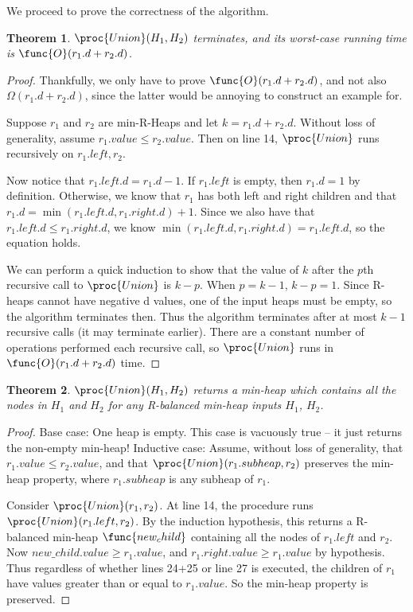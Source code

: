 \documentclass[11pt, answers]{exam}
\theoremstyle{plain}
\newtheorem{theorem}{Theorem}
\theoremstyle{definition}
\begin{document}
\begin{questions}
\begin{parts}
\begin{solution}
We proceed to prove the correctness of the algorithm. \\

\begin{theorem}
$\proc{Union}(H_1, H_2)$ terminates, and its worst-case running time is $\func{O}(r_1 .d + r_2 .d)$.
\end{theorem}

\begin{proof}
Thankfully, we only have to prove $\func{O}(r_1 .d + r_2 .d)$, and not also $\Omega(r_1 .d + r_2 .d)$, since the latter would be annoying to construct an example for. 

Suppose $r_1$ and $r_2$ are min-R-Heaps and let $k = r_1 .d + r_2 .d$. Without loss of generality, assume $r_1.value \leq r_2.value$. Then on line 14, $\proc{Union}$ runs recursively on $r_1.left, r_2$. 

Now notice that $r_1.left.d = r_1.d - 1$. If $r_1.left$ is empty, then $r_1.d = 1$ by definition. Otherwise, we know that $r_1$ has both left and right children and that $r_1.d = \min(r_1.left.d, r_1.right.d) + 1$. Since we also have that $r_1.left.d  \leq r_1.right.d$, we know
$\min(r_1.left.d, r_1.right.d) = r_1.left.d$, so the equation holds.

We can perform a quick induction to show that the value of $k$ after the $p$th recursive call to $\proc{Union}$ is $k-p$. When $p = k-1$, $k-p = 1$. Since R-heaps cannot have negative d values, one of the input heaps must be empty, so the algorithm terminates then. Thus the algorithm terminates after at most $k-1$ recursive calls (it may terminate earlier). There are a constant number of operations performed each recursive call, so $\proc{Union}$ runs in $\func{O}(r_1 .d + r_2 .d)$ time.
\end{proof}

\begin{theorem}
$\proc{Union}(H_1, H_2)$ returns a min-heap which contains all the nodes in $H_1$ and $H_2$ for any R-balanced min-heap inputs $H_1$, $H_2$.
\end{theorem}

\begin{proof}
Base case: One heap is empty. This case is vacuously true -- it just returns the non-empty min-heap!
Inductive case: Assume, without loss of generality, that $r_1.value \leq r_2.value$, and that $\proc{Union}(r_1.subheap, r_2)$ preserves the min-heap property, where $r_1.subheap$ is any subheap of $r_1$.

Consider $\proc{Union}(r_1, r_2)$. At line 14, the procedure runs $\proc{Union}(r_1.left, r_2)$. By the induction hypothesis, this returns a R-balanced min-heap $\func{new_child}$ containing all the nodes of $r_1.left$ and $r_2$. Now $new\_child.value \geq r_1.value$, and $r_1.right.value \geq r_1.value$ by hypothesis. Thus regardless of whether lines 24+25 or line 27 is executed, the children of $r_1$ have values greater than or equal to $r_1.value$. So the min-heap property is preserved.


\end{proof}
\end{solution}
\end{parts}
\end{questions}
\end{document}
